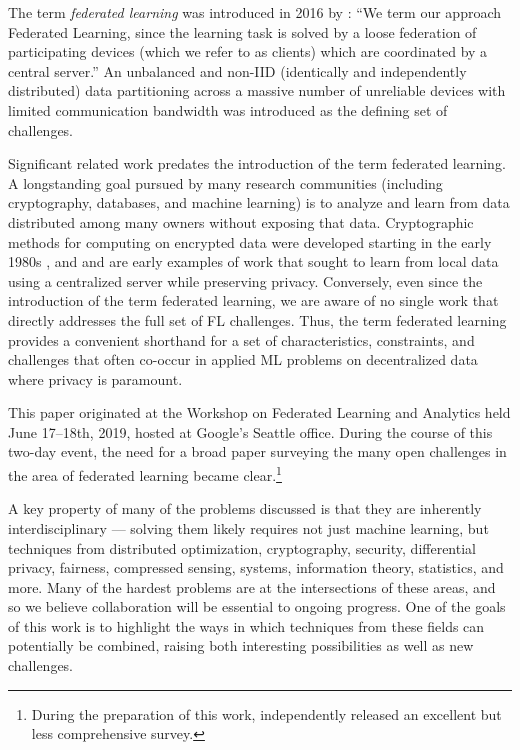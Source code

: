 \documentclass[11pt]{article}
\newcommand{\todo}[1]{[{\color{darkred}{TODO: \emph{#1}}}]}
\begin{document}
The term \emph{federated learning} was introduced in 2016 by \citet{mcmahan17fedavg}: ``We term our approach Federated Learning, since the learning task is solved by a loose federation of participating devices (which we refer to as clients) which are coordinated by a central server.''  An unbalanced and non-IID (identically and independently distributed) data partitioning across a massive number of unreliable devices with limited communication bandwidth was introduced as the defining set of challenges.

Significant related work predates the introduction of the term federated learning. A longstanding goal pursued by many research communities (including cryptography, databases, and machine learning) is to analyze and learn from data distributed among many owners without exposing that data. Cryptographic methods for computing on encrypted data were developed starting in the early 1980s \citep{Rivest1978,yao1982protocols}, and \citet{agrawal2000} and \citet{vaidya2008ppsvm} are early examples of work that sought to learn from local data using a centralized server while preserving privacy.
%
Conversely, even since the introduction of the term federated learning, we are aware of no single work that directly addresses the full set of FL challenges. Thus, the term federated learning provides a convenient shorthand for a set of characteristics, constraints, and challenges that often co-occur in applied ML problems on decentralized data where privacy is paramount.

This paper originated at the Workshop on Federated Learning and Analytics held June 17--18th, 2019, hosted at Google's Seattle office. During the course of this two-day event, the need for a broad paper surveying the many open challenges in the area of federated learning became clear.\footnote{During the preparation of this work, \citet{li2019federated} independently released an excellent but less comprehensive survey.}

A key property of many of the problems discussed is that they are inherently interdisciplinary --- solving them likely requires not just machine learning, but techniques from distributed optimization, cryptography, security, differential privacy, fairness, compressed sensing, systems, information theory, statistics, and more.  Many of the hardest problems are at the intersections of these areas, and so we believe collaboration will be essential to ongoing progress. One of the goals of this work is to highlight the ways in which techniques from these fields can potentially be combined, raising both interesting possibilities as well as new challenges.
\end{document}
